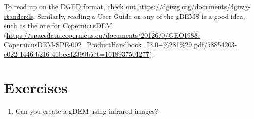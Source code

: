 To read up on the DGED format, check out \url{https://dgiwg.org/documents/dgiwg-standards}.
Similarly, reading a User Guide on any of the gDEMS is a good idea, such as the one for CopernicusDEM (\url{https://spacedata.copernicus.eu/documents/20126/0/GEO1988-CopernicusDEM-SPE-002_ProductHandbook_I3.0+%281%29.pdf/68854203-e022-1446-b216-41becd2399b5?t=1618937501277}).



%
\section{Exercises}

\begin{enumerate}
  \item Can you create a gDEM using infrared images?
\end{enumerate}
